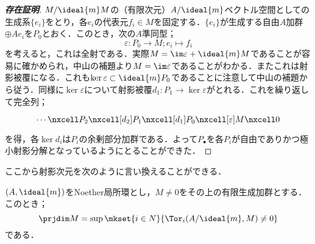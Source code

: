 \begin{proof}[\textbf{存在証明}]
	$M/\ideal{m}M$の（有限次元）$A/\ideal{m}$ベクトル空間としての生成系$\{e_i\}$をとり，各$e_i$の代表元$f_i\in M$を固定する．$\{e_i\}$が生成する自由$A$加群$\oplus Ae_i$を$P_0$とおく．このとき，次の$A$準同型；
	\[\varepsilon:P_0\to M;e_i\mapsto f_i\]
	を考えると，これは全射である．実際$M=\im\varepsilon+\ideal{m}M$であることが容易に確かめられ，中山の補題より$M=\im\varepsilon$であることがわかる．またこれは射影被覆になる．これも$\ker\varepsilon\subset\ideal{m}P_0$であることに注意して中山の補題から従う．同様に$\ker\varepsilon$について射影被覆$d_1:P_1\to\ker\varepsilon$がとれる．これを繰り返して完全列；
	\[\begin{tikzcd}
	\cdots\nxcell P_2\nxcell[d_2]P_1\nxcell[d_1]P_0\nxcell[\varepsilon]M\nxcell0
	\end{tikzcd}\]
	を得，各$\ker d_i$は$P_i$の余剰部分加群である．よって$P_\bullet$を各$P_i$が自由でありかつ極小射影分解となっているようにとることができた．
\end{proof}

ここから射影次元を次のように言い換えることができる．

\begin{thm}
	$(A,\ideal{m})$をNoether局所環とし，$M\neq0$をその上の有限生成加群とする．このとき；
	\[\prjdim M=\sup\mkset{i\in N}{\Tor_i(A/\ideal{m},M)\neq0}\]
	である．
\end{thm}